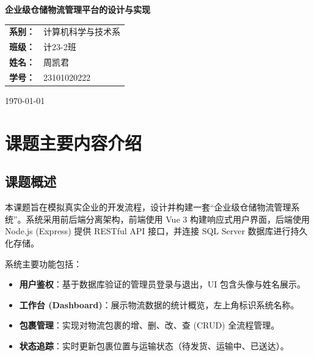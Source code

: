 \documentclass[UTF8, a4paper, 12pt]{ctexart}
\begin{document}
\begin{titlepage}
    \vspace*{1cm}
    \begin{center}
        \vspace{2cm}
        \Huge \textbf{企业级仓储物流管理平台的设计与实现} \\
        \vspace{3cm}

        \Large
        \renewcommand{\arraystretch}{1.5}
        \begin{tabular}{rl}
            \textbf{系别：} & 计算机科学与技术系 \\
            \textbf{班级：} & 计23-2班 \\
            \textbf{姓名：} & 周凯君 \\
            \textbf{学号：} & 23101020222 \\
        \end{tabular}

        \vspace{4cm}
        \today
    \end{center}
\end{titlepage}

\newpage
\thispagestyle{empty} %
\tableofcontents      %
\newpage
\setcounter{page}{1}  %


\section{课题主要内容介绍}

\subsection{课题概述}
本课题旨在模拟真实企业的开发流程，设计并构建一套“企业级仓储物流管理系统”。系统采用前后端分离架构，前端使用 Vue 3 构建响应式用户界面，后端使用 Node.js (Express) 提供 RESTful API 接口，并连接 SQL Server 数据库进行持久化存储。

系统主要功能包括：
\begin{itemize}
    \item \textbf{用户鉴权}：基于数据库验证的管理员登录与退出，UI 包含头像与姓名展示。
    \item \textbf{工作台 (Dashboard)}：展示物流数据的统计概览，左上角标识系统名称。
    \item \textbf{包裹管理}：实现对物流包裹的增、删、改、查 (CRUD) 全流程管理。
    \item \textbf{状态追踪}：实时更新包裹位置与运输状态（待发货、运输中、已送达）。
\end{itemize}
\end{document}
